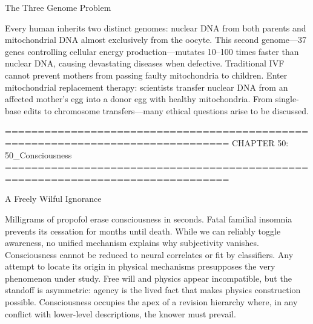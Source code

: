 The Three Genome Problem

Every human inherits two distinct genomes: nuclear DNA from both parents and mitochondrial DNA almost exclusively from the oocyte. This second genome—37 genes controlling cellular energy production—mutates 10–100 times faster than nuclear DNA, causing devastating diseases when defective. Traditional IVF cannot prevent mothers from passing faulty mitochondria to children. Enter mitochondrial replacement therapy: scientists transfer nuclear DNA from an affected mother's egg into a donor egg with healthy mitochondria. From single-base edits to chromosome transfers—many ethical questions arise to be discussed.


================================================================================
CHAPTER 50: 50_Consciousness
================================================================================

A Freely Wilful Ignorance

Milligrams of propofol erase consciousness in seconds. Fatal familial insomnia prevents its cessation for months until death. While we can reliably toggle awareness, no unified mechanism explains why subjectivity vanishes. Consciousness cannot be reduced to neural correlates or fit by classifiers. Any attempt to locate its origin in physical mechanisms presupposes the very phenomenon under study. Free will and physics appear incompatible, but the standoff is asymmetric: agency is the lived fact that makes physics construction possible. Consciousness occupies the apex of a revision hierarchy where, in any conflict with lower-level descriptions, the knower must prevail.

